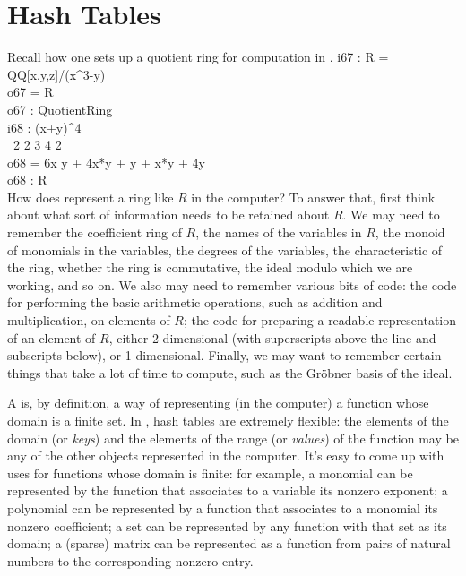 \section{Hash Tables}

Recall how one sets up a quotient ring for computation in \Mtwo.
\beginOutput
i67 : R = QQ[x,y,z]/(x^3-y)\\
\emptyLine
o67 = R\\
\emptyLine
o67 : QuotientRing\\
\endOutput
\beginOutput
i68 : (x+y)^4\\
\emptyLine
\        2 2       3    4           2\\
o68 = 6x y  + 4x*y  + y  + x*y + 4y\\
\emptyLine
o68 : R\\
\endOutput
How does \Mtwo represent a ring like $R$ in the computer?  To answer that,
first think about what sort of information needs to be retained about $R$.
We may need to remember the coefficient ring of $R$, the names of the
variables in $R$, the monoid of monomials in the variables, the degrees of
the variables, the characteristic of the ring, whether the ring is
commutative, the ideal modulo which we are working, and so on.  We also may
need to remember various bits of code: the code for performing the basic
arithmetic operations, such as addition and multiplication, on elements of
$R$; the code for preparing a readable representation of an element of $R$,
either 2-dimensional (with superscripts above the line and subscripts below),
or 1-dimensional.  Finally, we may want to remember certain things that take
a lot of time to compute, such as the Gr\"obner basis of the ideal.

A {\sl {}} is, by definition, a way of representing (in the computer)
a function whose domain is a finite set.  In \Mtwo, hash tables are extremely
flexible: the elements of the domain (or {\sl keys}) and the elements of the
range (or {\sl values}) of the function may be any of the other objects
represented in the computer.  It's easy to come up with uses for functions
whose domain is finite: for example, a monomial can be represented by the
function that associates to a variable its nonzero exponent; a polynomial can
be represented by a function that associates to a monomial its nonzero
coefficient; a set can be represented by any function with that set as its
domain; a (sparse) matrix can be represented as a function from pairs of
natural numbers to the corresponding nonzero entry.

